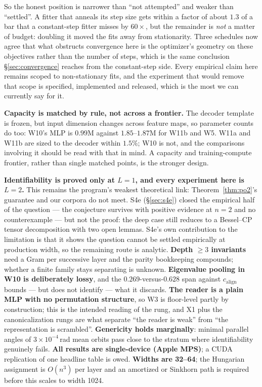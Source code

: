 \documentclass[10pt,twocolumn,letterpaper]{article}
\theoremstyle{definition}
\newcommand{\calign}{c_{\mathrm{align}}}
\begin{document}
So the honest position is narrower than ``not attempted'' and weaker than ``settled''. A fitter
that anneals its step size gets within a factor of about $1.3$ of a bar that a constant-step fitter
misses by $60\times$, but the remainder is \emph{not} a matter of budget: doubling it moved the
fits away from stationarity. Three schedules now agree that what obstructs convergence here is the
optimizer's geometry on these objectives rather than the number of steps, which is the same
conclusion \S\ref{sec:convergence} reaches from the constant-step side. Every empirical claim here remains scoped to non-stationary
fits, and the experiment that would remove that scope is specified, implemented and released,
which is the most we can currently say for it.

\textbf{Capacity is matched by rule, not across a frontier.} The decoder template is frozen, but
input dimension changes across feature maps, so parameter counts do too: W10's MLP is $0.99$M
against $1.85$--$1.87$M for W11b and W5. W11a and W11b are sized to the decoder within $1.5\%$; W10
is not, and the comparisons involving it should be read with that in mind. A capacity and
training-compute frontier, rather than single matched points, is the stronger design.

\textbf{Identifiability is proved only at $L=1$, and every experiment here is $L=2$.} This remains
the program's weakest theoretical link: Theorem~\ref{thm:po2}'s guarantee and our corpora do not
meet. S4e (\S\ref{sec:s4e}) closed the empirical half of the question --- the conjecture survives
with positive evidence at $n=2$ and no counterexample --- but not the proof: the deep case still
reduces to a Bessel--CP tensor decomposition with two open lemmas. S4e's own contribution to the
limitation is that it shows the question cannot be settled empirically at production width, so the
remaining route is analytic. \textbf{Depth $\ge 3$ invariants} need a Gram per successive layer and the
parity bookkeeping compounds; whether a finite family stays separating is unknown.
\textbf{Eigenvalue pooling in W10 is deliberately lossy}, and the $0.269$-versus-$0.628$ span
against $\calign$ bounds --- but does not identify --- what it discards. \textbf{The reader is a
plain MLP with no permutation structure}, so W3 is floor-level partly by construction; this is the
intended reading of the rung, and X1 plus the canonicalization rungs are what separate ``the
reader is weak'' from ``the representation is scrambled''. \textbf{Genericity holds marginally}:
minimal parallel angles of $3\times10^{-4}$\,rad mean orbits pass close to the stratum where
identifiability genuinely fails. \textbf{All results are single-device (Apple MPS)}; a CUDA
replication of one headline table is owed. \textbf{Widths are 32--64}; the Hungarian assignment is
$O(n^3)$ per layer and an amortized or Sinkhorn path is required before this scales to width 1024.
\end{document}
